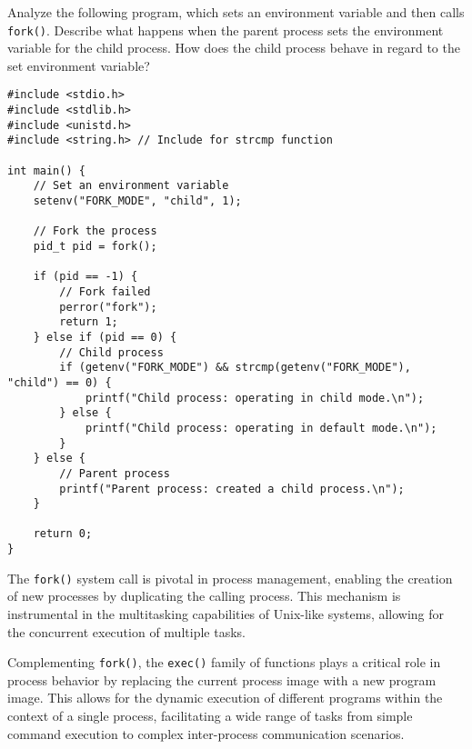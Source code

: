 \documentclass{dcbl/challenge}
\begin{document}
\begin{aufgabe}
Analyze the following program, which sets an environment variable and then calls \texttt{fork()}. Describe what happens when the parent process sets the environment variable for the child process. How does the child process behave in regard to the set environment variable?

\begin{lstlisting}
#include <stdio.h>
#include <stdlib.h>
#include <unistd.h>
#include <string.h> // Include for strcmp function

int main() {
    // Set an environment variable
    setenv("FORK_MODE", "child", 1);

    // Fork the process
    pid_t pid = fork();

    if (pid == -1) {
        // Fork failed
        perror("fork");
        return 1;
    } else if (pid == 0) {
        // Child process
        if (getenv("FORK_MODE") && strcmp(getenv("FORK_MODE"), "child") == 0) {
            printf("Child process: operating in child mode.\n");
        } else {
            printf("Child process: operating in default mode.\n");
        }
    } else {
        // Parent process
        printf("Parent process: created a child process.\n");
    }

    return 0;
}
\end{lstlisting}
The \texttt{fork()} system call is pivotal in process management, enabling the creation of new processes by duplicating the calling process. This mechanism is instrumental in the multitasking capabilities of Unix-like systems, allowing for the concurrent execution of multiple tasks.

Complementing \texttt{fork()}, the \texttt{exec()} family of functions plays a critical role in process behavior by replacing the current process image with a new program image. This allows for the dynamic execution of different programs within the context of a single process, facilitating a wide range of tasks from simple command execution to complex inter-process communication scenarios.
\end{aufgabe}
\end{document}
